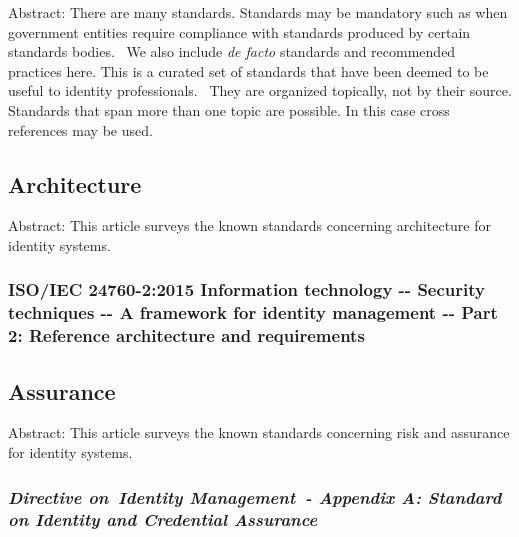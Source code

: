 Abstract: There are many standards. Standards may be mandatory such as
when government entities require compliance with standards produced by
certain standards bodies.~ We also include \emph{de facto} standards and
recommended practices here. This is a curated set of standards that have
been deemed to be useful to identity professionals.~ They are organized
topically, not by their source. Standards that span more than one topic
are possible. In this case cross references may be used.

\hypertarget{architecture}{%
\subsection{Architecture}\label{architecture}}

Abstract: This article surveys the known standards concerning
architecture for identity systems.

\hypertarget{isoiec-24760-22015-information-technology----security-techniques----a-framework-for-identity-management----part-2-reference-architecture-and-requirements}{%
\subsubsection{ISO/IEC 24760-2:2015 Information technology -\/- Security
techniques -\/- A framework for identity management -\/- Part 2:
Reference architecture and
requirements}\label{isoiec-24760-22015-information-technology----security-techniques----a-framework-for-identity-management----part-2-reference-architecture-and-requirements}}

\hypertarget{assurance}{%
\subsection{Assurance}\label{assurance}}

Abstract: This article surveys the known standards concerning risk and
assurance for identity systems.

\hypertarget{directive-on-identity-management---appendix-a-standard-on-identity-and-credential-assurance}{%
\subsubsection{\texorpdfstring{\emph{Directive on~Identity Management~-
Appendix A: Standard on Identity and Credential
Assurance}}{Directive on~Identity Management~- Appendix A: Standard on Identity and Credential Assurance}}\label{directive-on-identity-management---appendix-a-standard-on-identity-and-credential-assurance}}

